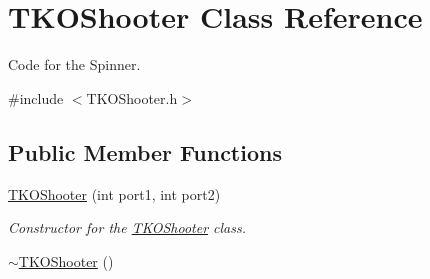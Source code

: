 \hypertarget{class_t_k_o_shooter}{\section{T\-K\-O\-Shooter Class Reference}
\label{class_t_k_o_shooter}
}


Code for the Spinner.  




{\ttfamily \#include $<$T\-K\-O\-Shooter.\-h$>$}

\subsection*{Public Member Functions}
\begin{DoxyCompactItemize}
\item 
\hyperlink{class_t_k_o_shooter_afebd0cc2e0d128cf4ac33db914e57e56}{T\-K\-O\-Shooter} (int port1, int port2)
\begin{DoxyCompactList}\small\item\em Constructor for the \hyperlink{class_t_k_o_shooter}{T\-K\-O\-Shooter} class. \end{DoxyCompactList}\item 
\hypertarget{class_t_k_o_shooter_ae3d59bb88578fa48e014887e9ebfc9f2}{\hyperlink{class_t_k_o_shooter_ae3d59bb88578fa48e014887e9ebfc9f2}{$\sim$\-T\-K\-O\-Shooter} ()}\label{class_t_k_o_shooter_ae3d59bb88578fa48e014887e9ebfc9f2}


\end{DoxyCompactItemize}
